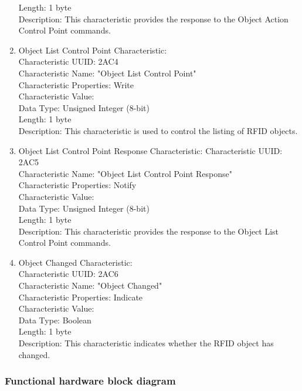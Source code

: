 \documentclass[a4paper,11pt]{article}%
\begin{document}
\begin{enumerate}
          Length: 1 byte\\
          Description: This characteristic provides the response to the Object Action Control Point commands.
    \item Object List Control Point Characteristic:\\
          Characteristic UUID: 2AC4\\
          Characteristic Name: "Object List Control Point"\\
          Characteristic Properties: Write\\
          Characteristic Value:\\
          Data Type: Unsigned Integer (8-bit)\\
          Length: 1 byte\\
          Description: This characteristic is used to control the listing of RFID objects.
    \item Object List Control Point Response Characteristic:
          Characteristic UUID: 2AC5\\
          Characteristic Name: "Object List Control Point Response"\\
          Characteristic Properties: Notify\\
          Characteristic Value:\\
          Data Type: Unsigned Integer (8-bit)\\
          Length: 1 byte\\
          Description: This characteristic provides the response to the Object List Control Point commands.\\
    \item Object Changed Characteristic:\\
          Characteristic UUID: 2AC6\\
          Characteristic Name: "Object Changed"\\
          Characteristic Properties: Indicate\\
          Characteristic Value:\\
          Data Type: Boolean\\
          Length: 1 byte\\
          Description: This characteristic indicates whether the RFID object has changed.\\
\end{enumerate}


\pagebreak
\subsubsection{Functional hardware block diagram}
\end{document}
